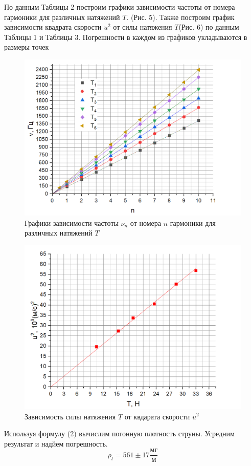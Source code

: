 \documentclass[a4paper,12pt]{article} %
\begin{document}
По данным Таблицы 2 построим графики зависимости частоты от номера гармоники для различных натяжений $T$. (Рис. 5). Также построим график зависимости квадрата скорости $u^2$ от силы натяжения $T$(Рис. 6) по данным Таблицы 1 и Таблицы 3. Погрешности в каждом из графиков укладываются в размеры точек 
\newpage
\begin{figure}[!h]
\centering
\includegraphics[scale=0.4]{11}
\caption{Графики зависимости частоты $\nu_n$ от номера $n$ гармоники для различных натяжений $T$}
\end{figure}
\begin{figure}[!h]
\centering
\includegraphics[scale=0.28]{12}
\caption{Зависимость силы натяжения $T$ от квдарата скорости $u^2$}
\end{figure}
Используя формулу (2) вычислим погонную плотность струны. Усредним результат и надйем погрешность.
\[\rho_l = 561\pm17\frac{\text{мг}}{\text{м}}\]
\end{document}
